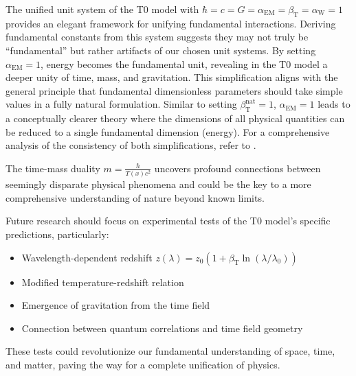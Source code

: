 \documentclass[12pt,a4paper]{article}
\newcommand{\Tfield}{T(x)}
\newcommand{\betaT}{\beta_{\text{T}}}
\newcommand{\alphaEM}{\alpha_{\text{EM}}}
\newcommand{\alphaW}{\alpha_{\text{W}}}
\begin{document}
	The unified unit system of the T0 model with \(\hbar = c = G = \alphaEM = \betaT = \alphaW = 1\) provides an elegant framework for unifying fundamental interactions. Deriving fundamental constants from this system suggests they may not truly be “fundamental” but rather artifacts of our chosen unit systems. By setting \(\alphaEM = 1\), energy becomes the fundamental unit, revealing in the T0 model a deeper unity of time, mass, and gravitation. This simplification aligns with the general principle that fundamental dimensionless parameters should take simple values in a fully natural formulation. Similar to setting \(\betaT^{\text{nat}} = 1\), \(\alphaEM = 1\) leads to a conceptually clearer theory where the dimensions of all physical quantities can be reduced to a single fundamental dimension (energy). For a comprehensive analysis of the consistency of both simplifications, refer to \cite{pascher_alphabeta_2025}.
	
	The time-mass duality \(m = \frac{\hbar}{\Tfield c^2}\) uncovers profound connections between seemingly disparate physical phenomena and could be the key to a more comprehensive understanding of nature beyond known limits.
	
	Future research should focus on experimental tests of the T0 model’s specific predictions, particularly:
	
	\begin{itemize}
		\item Wavelength-dependent redshift \(z(\lambda) = z_0 (1 + \betaT \ln(\lambda/\lambda_0))\)
		\item Modified temperature-redshift relation
		\item Emergence of gravitation from the time field
		\item Connection between quantum correlations and time field geometry
	\end{itemize}
	
	These tests could revolutionize our fundamental understanding of space, time, and matter, paving the way for a complete unification of physics.
	
\end{document}
